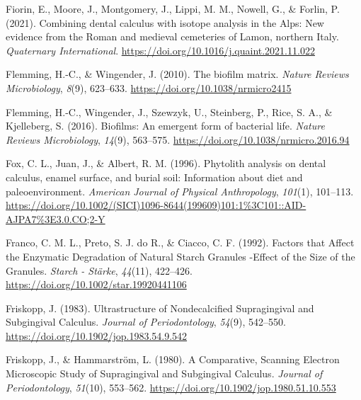 \documentclass[
  letterpaper,
]{book}
\newlength{\cslhangindent}
\newlength{\cslentryspacingunit} %
\newenvironment{CSLReferences}[2] %
 {%
  \setlength{\parindent}{0pt}
  \ifodd #1
  \let\oldpar\par
  \def\par{\hangindent=\cslhangindent\oldpar}
  \fi
  \setlength{\parskip}{#2\cslentryspacingunit}
 }%
 {}
\begin{document}
\begin{CSLReferences}{1}{0}
\leavevmode{}%
Fiorin, E., Moore, J., Montgomery, J., Lippi, M. M., Nowell, G., \&
Forlin, P. (2021). Combining dental calculus with isotope analysis in
the {Alps}: {New} evidence from the {Roman} and medieval cemeteries of
{Lamon}, northern {Italy}. \emph{Quaternary International}.
\url{https://doi.org/10.1016/j.quaint.2021.11.022}

\leavevmode{}%
Flemming, H.-C., \& Wingender, J. (2010). The biofilm matrix.
\emph{Nature Reviews Microbiology}, \emph{8}(9), 623--633.
\url{https://doi.org/10.1038/nrmicro2415}

\leavevmode{}%
Flemming, H.-C., Wingender, J., Szewzyk, U., Steinberg, P., Rice, S. A.,
\& Kjelleberg, S. (2016). Biofilms: An emergent form of bacterial life.
\emph{Nature Reviews Microbiology}, \emph{14}(9), 563--575.
\url{https://doi.org/10.1038/nrmicro.2016.94}

\leavevmode{}%
Fox, C. L., Juan, J., \& Albert, R. M. (1996). Phytolith analysis on
dental calculus, enamel surface, and burial soil: {Information} about
diet and paleoenvironment. \emph{American Journal of Physical
Anthropology}, \emph{101}(1), 101--113.
\url{https://doi.org/10.1002/(SICI)1096-8644(199609)101:1\%3C101::AID-AJPA7\%3E3.0.CO;2-Y}

\leavevmode{}%
Franco, C. M. L., Preto, S. J. do R., \& Ciacco, C. F. (1992). Factors
that {Affect} the {Enzymatic Degradation} of {Natural Starch Granules}
-{Effect} of the {Size} of the {Granules}. \emph{Starch - Stärke},
\emph{44}(11), 422--426. \url{https://doi.org/10.1002/star.19920441106}

\leavevmode{}%
Friskopp, J. (1983). Ultrastructure of {Nondecalcified Supragingival}
and {Subgingival Calculus}. \emph{Journal of Periodontology},
\emph{54}(9), 542--550. \url{https://doi.org/10.1902/jop.1983.54.9.542}

\leavevmode{}%
Friskopp, J., \& Hammarström, L. (1980). A {Comparative}, {Scanning
Electron Microscopic Study} of {Supragingival} and {Subgingival
Calculus}. \emph{Journal of Periodontology}, \emph{51}(10), 553--562.
\url{https://doi.org/10.1902/jop.1980.51.10.553}


\end{CSLReferences}
\end{document}
